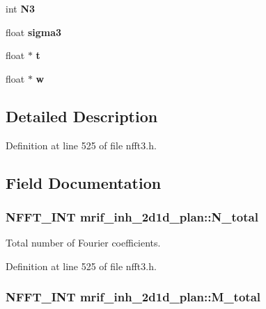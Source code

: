 \begin{DoxyCompactItemize}
\item 
\hypertarget{structmrif__inh__2d1d__plan_ae083ca7967f0ac15dca241336782f353}{int {\bfseries N3}}\label{structmrif__inh__2d1d__plan_ae083ca7967f0ac15dca241336782f353}

\item 
\hypertarget{structmrif__inh__2d1d__plan_a7feb68d7fd4fe5590700ddf6aa64d27c}{float {\bfseries sigma3}}\label{structmrif__inh__2d1d__plan_a7feb68d7fd4fe5590700ddf6aa64d27c}

\item 
\hypertarget{structmrif__inh__2d1d__plan_a601416c33ee05eb2cc89b3a03aa0bb0b}{float $\ast$ {\bfseries t}}\label{structmrif__inh__2d1d__plan_a601416c33ee05eb2cc89b3a03aa0bb0b}

\item 
\hypertarget{structmrif__inh__2d1d__plan_a53834de9b90ac2eb35eb5bf5b00bdfac}{float $\ast$ {\bfseries w}}\label{structmrif__inh__2d1d__plan_a53834de9b90ac2eb35eb5bf5b00bdfac}

\end{DoxyCompactItemize}


\subsection{Detailed Description}


Definition at line 525 of file nfft3.\-h.



\subsection{Field Documentation}
\hypertarget{structmrif__inh__2d1d__plan_a7846a173c42c9b65d4e93a16da121ff4}{
\subsubsection[{N\-\_\-total}]{\setlength{\rightskip}{0pt plus 5cm}N\-F\-F\-T\-\_\-\-I\-N\-T mrif\-\_\-inh\-\_\-2d1d\-\_\-plan\-::\-N\-\_\-total}}\label{structmrif__inh__2d1d__plan_a7846a173c42c9b65d4e93a16da121ff4}


Total number of Fourier coefficients. 



Definition at line 525 of file nfft3.\-h.

\hypertarget{structmrif__inh__2d1d__plan_aa88bdba25fa7c21f526b91ae6cb4b84e}{
\subsubsection[{M\-\_\-total}]{\setlength{\rightskip}{0pt plus 5cm}N\-F\-F\-T\-\_\-\-I\-N\-T mrif\-\_\-inh\-\_\-2d1d\-\_\-plan\-::\-M\-\_\-total}}\label{structmrif__inh__2d1d__plan_aa88bdba25fa7c21f526b91ae6cb4b84e}


